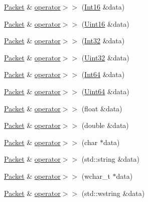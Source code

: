 \begin{DoxyCompactItemize}
\item 
\hyperlink{classsf_1_1_packet}{Packet} \& \hyperlink{classsf_1_1_packet_af82d6c4e6d74f2ca39732c1e29f30781}{operator$>$$>$} (\hyperlink{namespacesf_a3c8e10435e2a310a7741755e66b5c94e}{Int16} \&data)
\item 
\hyperlink{classsf_1_1_packet}{Packet} \& \hyperlink{classsf_1_1_packet_afd8706f092bc830ebb438aeee9271647}{operator$>$$>$} (\hyperlink{namespacesf_a2fcaf787248b0b83dfb6b145ca348246}{Uint16} \&data)
\item 
\hyperlink{classsf_1_1_packet}{Packet} \& \hyperlink{classsf_1_1_packet_ae7b44e79f12d500b63f5dc2a10d78d8c}{operator$>$$>$} (\hyperlink{namespacesf_ac2dfd4952377a26dee4750e2e4a30a15}{Int32} \&data)
\item 
\hyperlink{classsf_1_1_packet}{Packet} \& \hyperlink{classsf_1_1_packet_a4b57e1953db5bec39a851929df9a339a}{operator$>$$>$} (\hyperlink{namespacesf_aa746fb1ddef4410bddf198ebb27e727c}{Uint32} \&data)
\item 
\hyperlink{classsf_1_1_packet}{Packet} \& \hyperlink{classsf_1_1_packet_a8409de6477e17ca48225a835451261c1}{operator$>$$>$} (\hyperlink{namespacesf_a2840579fed3494d9f330baf7a5a19903}{Int64} \&data)
\item 
\hyperlink{classsf_1_1_packet}{Packet} \& \hyperlink{classsf_1_1_packet_a8fa9c970062753b03e43db4999fc7743}{operator$>$$>$} (\hyperlink{namespacesf_add9ac83466d96b9f50a009b9f4064266}{Uint64} \&data)
\item 
\hyperlink{classsf_1_1_packet}{Packet} \& \hyperlink{classsf_1_1_packet_a6704b4d13d6f798efe6fa836a8b5fa24}{operator$>$$>$} (float \&data)
\item 
\hyperlink{classsf_1_1_packet}{Packet} \& \hyperlink{classsf_1_1_packet_ac84239a8ba0a165394805c17b35a88cf}{operator$>$$>$} (double \&data)
\item 
\hyperlink{classsf_1_1_packet}{Packet} \& \hyperlink{classsf_1_1_packet_ae9f8d8b0c776204f79f615b1e58bccec}{operator$>$$>$} (char $\ast$data)
\item 
\hyperlink{classsf_1_1_packet}{Packet} \& \hyperlink{classsf_1_1_packet_aabace32063c44e1a5cc54af6267c1fab}{operator$>$$>$} (std\-::string \&data)
\item 
\hyperlink{classsf_1_1_packet}{Packet} \& \hyperlink{classsf_1_1_packet_a1444500d29df0991e630ac78933c6282}{operator$>$$>$} (wchar\-\_\-t $\ast$data)
\item 
\hyperlink{classsf_1_1_packet}{Packet} \& \hyperlink{classsf_1_1_packet_ab74c37a290385fd7b1f962bf954a2005}{operator$>$$>$} (std\-::wstring \&data)

\end{DoxyCompactItemize}
